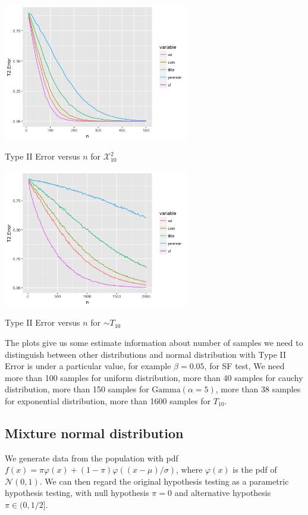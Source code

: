 \documentclass[twoside]{article}
\begin{document}
\begin{center}
\makeatletter
\def\@captype{figure}
\makeatother
\includegraphics [height=6cm]{code/chisq.png}
\caption{Type II Error versus $n$ for $\mathcal{X}^2_{10}$}
\label{T2Echisq}
\end{center}

\begin{center}
\makeatletter
\def\@captype{figure}
\makeatother
\includegraphics [height=6cm]{code/t.png}
\caption{Type II Error versus $n$ for $\sim T_{10}$}
\label{T2Et}
\end{center}

The plots give us some estimate information about number of samples we need to distinguish between other distributions and normal distribution with Type II Error is under a particular value, for example $\beta=0.05$, for SF test, We need more than 100 samples for uniform distribution, more than 40 samples for cauchy distribution, more than 150 samples for $\mathrm{Gamma}(\alpha=5)$, more than 38 samples for exponential distribution, more than 1600 samples for $T_{10}$.

\subsection{Mixture normal distribution}

We generate data from the population with pdf $f(x)=\pi \varphi(x) + (1-\pi) \varphi((x-\mu)/\sigma)$, where $\varphi(x)$ is the pdf of $\mathcal{N}(0,1)$. We can then regard the original hypothesis testing as a parametric hypothesis testing, with null hypothesis $\pi=0$ and alternative hypothesis $\pi \in (0,1/2]$. 
\end{document}
